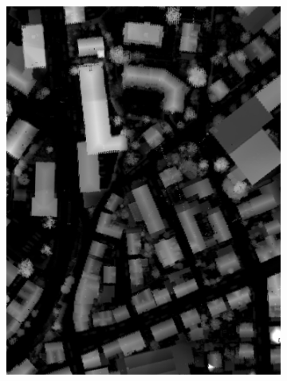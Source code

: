 \begin{figure}[htb]
\begin{subfigure}{0.19\textwidth}
\end{subfigure}\vspace{1mm}
\begin{subfigure}{0.19\textwidth}
  \centering
  \includegraphics[width=1\linewidth]{fig/vai/1_hm.jpg}
\end{subfigure}
\begin{subfigure}{0.19\textwidth}
  \centering

\end{subfigure}
\end{figure}
